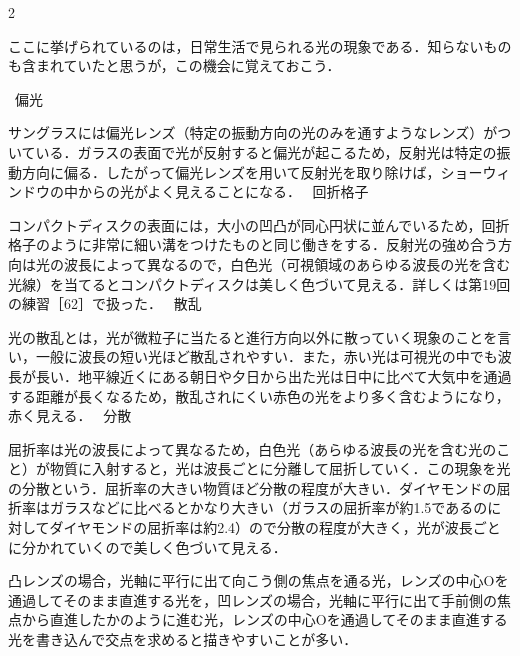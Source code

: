\newpage

\setlength{\columnseprule}{0.4pt}
\begin{multicols}{2}
\raggedcolumns

\par\nopagebreak
\begin{sisin}
ここに挙げられているのは，日常生活で見られる光の現象である．知らないものも含まれていたと思うが，この機会に覚えておこう．
\end{sisin}
\KaiHead
\begin{komon}
 \ {\gtfamily 偏光}\Ans

       サングラスには偏光レンズ（特定の振動方向の光のみを通すようなレンズ）がついている．ガラスの表面で光が反射すると偏光が起こるため，反射光は特定の振動方向に偏る．したがって偏光レンズを用いて反射光を取り除けば，ショーウィンドウの中からの光がよく見えることになる．
 \ {\gtfamily 回折格子}\Ans

       コンパクトディスクの表面には，大小の凹凸が同心円状に並んでいるため，回折格子のように非常に細い溝をつけたものと同じ働きをする．反射光の強め合う方向は光の波長によって異なるので，白色光（可視領域のあらゆる波長の光を含む光線）を当てるとコンパクトディスクは美しく色づいて見える．詳しくは第19回の練習［62］で扱った．
 \ {\gtfamily 散乱}\Ans

       光の散乱とは，光が微粒子に当たると進行方向以外に散っていく現象のことを言い，一般に波長の短い光ほど散乱されやすい．また，赤い光は可視光の中でも波長が長い．地平線近くにある朝日や夕日から出た光は日中に比べて大気中を通過する距離が長くなるため，散乱されにくい赤色の光をより多く含むようになり，赤く見える．
 \ {\gtfamily 分散}\Ans

       屈折率は光の波長によって異なるため，白色光（あらゆる波長の光を含む光のこと）が物質に入射すると，光は波長ごとに分離して屈折していく．この現象を光の分散という．屈折率の大きい物質ほど分散の程度が大きい．ダイヤモンドの屈折率はガラスなどに比べるとかなり大きい（ガラスの屈折率が約1.5であるのに対してダイヤモンドの屈折率は約2.4）ので分散の程度が大きく，光が波長ごとに分かれていくので美しく色づいて見える．
\end{komon}

\par\nopagebreak
\begin{sisin}
凸レンズの場合，{\gtfamily {}光軸に平行に出て向こう側の焦点を通る光}，{\gtfamily {}レンズの中心$\mathrm{O}$を通過してそのまま直進する光}を，凹レンズの場合，{\gtfamily {}光軸に平行に出て手前側の焦点から直進したかのように進む光}，{\gtfamily {}レンズの中心$\mathrm{O}$を通過してそのまま直進する光}を書き込んで交点を求めると描きやすいことが多い．


\end{sisin}
\end{multicols}
